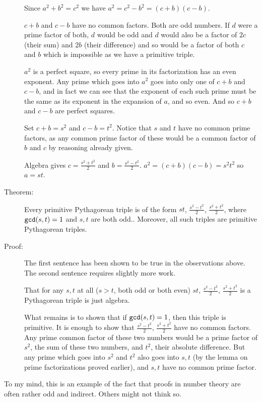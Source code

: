 \documentclass[12pt]{article}
\begin{document}
\begin{description}
Since $a^2+b^2=c^2$ we have $a^2=c^2-b^2=(c+b)(c-b)$.

$c+b$ and $c-b$ have no common factors.  Both are odd numbers.   If $d$ were a prime factor of both,
$d$ would be odd and $d$ would also be a factor of $2c$ (their sum) and $2b$ (their difference) and so would be
a factor of both $c$ and $b$ which is impossible as we have a primitive triple.

$a^2$ is a perfect square, so every prime in its factorization has an even exponent.  Any prime which goes
into $a^2$ goes into only one of $c+b$ and $c-b$, and in fact we can see that the exponent of each such prime must be the same as its exponent in the expansion of $a$, and so even.  And so $c+b$ and $c-b$ are perfect squares.

Set $c+b = s^2$ and $c-b=t^2$.   Notice that $s$ and $t$ have no common prime factors, as any common prime factor of these would be a common factor of $b$ and $c$ by reasoning already given.

Algebra gives $c=\frac{s^2+t^2}2$ and $b=\frac{s^2-t^2}2$.  $a^2=(c+b)(c-b)=s^2t^2$ so $a=st$.

\item[Theorem:]   Every primitive Pythagorean triple is of the form $st$, $\frac{s^2-t^2}2$, $\frac{s^2+t^2}2$,
where ${\tt gcd}(s,t)=1$ and $s,t$ are both odd..   Moreover, all such triples are primitive Pythagorean triples.

\item[Proof:]   The first sentence has been shown to be true in the observations above.  The second sentence
requires slightly more work.

That for any $s,t$ at all  ($s>t$, both odd or both even) $st$, $\frac{s^2-t^2}2$, $\frac{s^2+t^2}2$ is a Pythagorean triple is just algebra.

What remains is to shown that if ${\tt gcd}(s,t)=1$, then this triple is primitive.   It is enough to show
that $\frac{s^2-t^2}2$, $\frac{s^2+t^2}2$ have no common factors.   Any prime common factor of these two
numbers would be a prime factor of $s^2$, the sum of these two numbers, and $t^2$, their absolute difference.
But any prime which goes into $s^2$ and $t^2$ also goes into $s,t$ (by the lemma on prime factorizations proved earlier), and $s,t$ have no common prime factor.

\end{description}

To my mind, this is an example of the fact that proofs in number theory are often rather odd and indirect.  Others might not think so.
\end{document}
